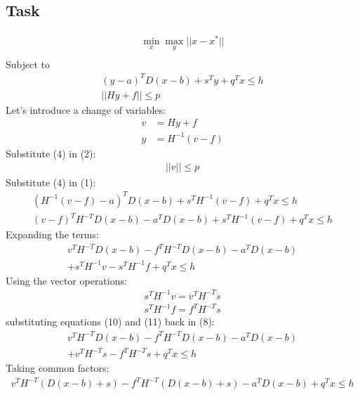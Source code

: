 \documentclass[a4paper]{article}
\begin{document}
\setlength\parindent{0pt}
\begin{Large}
\section{Task}

\begin{align*}
    \min_x \max_y || x - x^* || \\
\end{align*}
Subject to
\begin{align}
   (y-a)^T D (x-b) + s^T y + q^T x \leq h \\
   ||Hy+f|| \leq p
\end{align}
Let's introduce a change of variables:
\begin{align}
    v &= H y + f \\ 
    y &= H^{-1}(v-f)
\end{align}
Substitute (4) in (2):
\begin{align}
    ||v|| \leq p 
\end{align}
Substitute (4) in (1):
\begin{align}
    ( H^{-1}(v-f)-a)^T D (x-b) + s^T  H^{-1}(v-f) + q^T x \leq h \\
    (v-f)^T H^{-T} D (x-b) - a^T D (x-b) + s^T H^{-1}(v-f) + q^T x \leq h
\end{align}
Expanding the terms:
\begin{align}
    v^T H^{-T} D (x-b) -f^T H^{-T} D (x-b) - a^T D (x-b) \\+ s^T H^{-1}v - s^T H^{-1} f + q^T x \leq h
\end{align}
Using the vector operations:
\begin{align}
    s^T H^{-1}v = v^T H^{-T} s \\
    s^T H^{-1} f = f^T H^{-T} s
\end{align}
substituting equations (10) and (11) back in (8):
\begin{align}
    v^T H^{-T} D (x-b) -f^T H^{-T} D (x-b) - a^T D (x-b) \\+ v^T H^{-T} s - f^T H^{-T} s + q^T x \leq h
\end{align}
Taking common factors:
\begin{align}
    v^T H^{-T} (D (x-b) +s) - f^T H^{-T} (D (x-b)+s) - a^T D (x-b) + q^T x \leq h
\end{align}



\end{Large}
\end{document}
